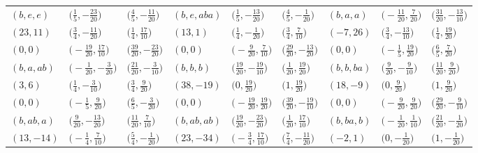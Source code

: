 \documentclass[10pt,a4paper]{amsart}
\theoremstyle{definition}
\numberwithin{equation}{section}
\begin{document}
\begin{landscape}
\begin{table}[th]
\begin{tabular}{|lll|lll|lll|}
\\\hline
$(b, e, e)$ & $\bigl(\frac{1}{5}, -\frac{23}{20}\bigr)$ & $\bigl(\frac{4}{5}, -\frac{11}{20}\bigr)$ & $(b, e, aba)$ & $\bigl(\frac{1}{5}, -\frac{13}{20}\bigr)$ & $\bigl(\frac{4}{5}, -\frac{1}{20}\bigr)$ & $(b, a, a)$ & $\bigl(-\frac{11}{20}, \frac{7}{20}\bigr)$ & $\bigl(\frac{31}{20}, -\frac{13}{10}\bigr)$
\\
$(23, 11)$ & $\bigl(\frac{3}{4}, -\frac{11}{20}\bigr)$ & $\bigl(\frac{1}{4}, \frac{17}{10}\bigr)$ & $(13, 1)$ & $\bigl(\frac{1}{4}, -\frac{1}{20}\bigr)$ & $\bigl(\frac{3}{4}, \frac{7}{10}\bigr)$ & $(-7, 26)$ & $\bigl(\frac{3}{4}, -\frac{13}{10}\bigr)$ & $\bigl(\frac{1}{4}, \frac{19}{20}\bigr)$
\\
$(0, 0)$ & $\bigl(-\frac{19}{20}, \frac{17}{10}\bigr)$ & $\bigl(\frac{39}{20}, -\frac{23}{20}\bigr)$ & $(0, 0)$ & $\bigl(-\frac{9}{20}, \frac{7}{10}\bigr)$ & $\bigl(\frac{29}{20}, -\frac{13}{20}\bigr)$ & $(0, 0)$ & $\bigl(-\frac{1}{5}, \frac{19}{20}\bigr)$ & $\bigl(\frac{6}{5}, \frac{7}{20}\bigr)$
\\\hline
$(b, a, ab)$ & $\bigl(-\frac{1}{20}, -\frac{3}{20}\bigr)$ & $\bigl(\frac{21}{20}, -\frac{3}{10}\bigr)$ & $(b, b, b)$ & $\bigl(\frac{19}{20}, -\frac{19}{10}\bigr)$ & $\bigl(\frac{1}{20}, \frac{19}{20}\bigr)$ & $(b, b, ba)$ & $\bigl(\frac{9}{20}, -\frac{9}{10}\bigr)$ & $\bigl(\frac{11}{20}, \frac{9}{20}\bigr)$
\\
$(3, 6)$ & $\bigl(\frac{1}{4}, -\frac{3}{10}\bigr)$ & $\bigl(\frac{3}{4}, \frac{9}{20}\bigr)$ & $(38, -19)$ & $\bigl(0, \frac{19}{20}\bigr)$ & $\bigl(1, \frac{19}{20}\bigr)$ & $(18, -9)$ & $\bigl(0, \frac{9}{20}\bigr)$ & $\bigl(1, \frac{9}{20}\bigr)$
\\
$(0, 0)$ & $\bigl(-\frac{1}{5}, \frac{9}{20}\bigr)$ & $\bigl(\frac{6}{5}, -\frac{3}{20}\bigr)$ & $(0, 0)$ & $\bigl(-\frac{19}{20}, \frac{19}{20}\bigr)$ & $\bigl(\frac{39}{20}, -\frac{19}{10}\bigr)$ & $(0, 0)$ & $\bigl(-\frac{9}{20}, \frac{9}{20}\bigr)$ & $\bigl(\frac{29}{20}, -\frac{9}{10}\bigr)$
\\\hline
$(b, ab, a)$ & $\bigl(\frac{9}{20}, -\frac{13}{20}\bigr)$ & $\bigl(\frac{11}{20}, \frac{7}{10}\bigr)$ & $(b, ab, ab)$ & $\bigl(\frac{19}{20}, -\frac{23}{20}\bigr)$ & $\bigl(\frac{1}{20}, \frac{17}{10}\bigr)$ & $(b, ba, b)$ & $\bigl(-\frac{1}{20}, \frac{1}{10}\bigr)$ & $\bigl(\frac{21}{20}, -\frac{1}{20}\bigr)$
\\
$(13, -14)$ & $\bigl(-\frac{1}{4}, \frac{7}{10}\bigr)$ & $\bigl(\frac{5}{4}, -\frac{1}{20}\bigr)$ & $(23, -34)$ & $\bigl(-\frac{3}{4}, \frac{17}{10}\bigr)$ & $\bigl(\frac{7}{4}, -\frac{11}{20}\bigr)$ & $(-2, 1)$ & $\bigl(0, -\frac{1}{20}\bigr)$ & $\bigl(1, -\frac{1}{20}\bigr)$

\end{tabular}
\end{table}
\end{landscape}
\end{document}
